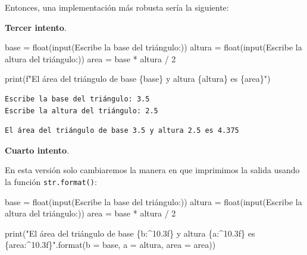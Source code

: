 \documentclass[
  spanish,
  letterpaper,
]{scrbook}
\newenvironment{Shaded}{\begin{snugshade}}{\end{snugshade}}
\newcommand{\BuiltInTok}[1]{\textcolor[rgb]{0.00,0.23,0.31}{#1}}
\newcommand{\DecValTok}[1]{\textcolor[rgb]{0.68,0.00,0.00}{#1}}
\newcommand{\NormalTok}[1]{\textcolor[rgb]{0.00,0.23,0.31}{#1}}
\newcommand{\OperatorTok}[1]{\textcolor[rgb]{0.37,0.37,0.37}{#1}}
\newcommand{\SpecialCharTok}[1]{\textcolor[rgb]{0.37,0.37,0.37}{#1}}
\newcommand{\SpecialStringTok}[1]{\textcolor[rgb]{0.13,0.47,0.30}{#1}}
\newcommand{\StringTok}[1]{\textcolor[rgb]{0.13,0.47,0.30}{#1}}
\theoremstyle{definition}
\theoremstyle{remark}
\begin{document}
Entonces, una implementación más robusta sería la siguiente:

\textbf{Tercer intento}.

\begin{Shaded}
\begin{Highlighting}[]
\NormalTok{base }\OperatorTok{=} \BuiltInTok{float}\NormalTok{(}\BuiltInTok{input}\NormalTok{(}\StringTok{\textquotesingle{}Escribe la base del triángulo:\textquotesingle{}}\NormalTok{))}
\NormalTok{altura }\OperatorTok{=} \BuiltInTok{float}\NormalTok{(}\BuiltInTok{input}\NormalTok{(}\StringTok{\textquotesingle{}Escribe la altura del triángulo:\textquotesingle{}}\NormalTok{))}
\NormalTok{area }\OperatorTok{=}\NormalTok{ base }\OperatorTok{*}\NormalTok{ altura }\OperatorTok{/} \DecValTok{2}

\BuiltInTok{print}\NormalTok{(}\SpecialStringTok{f"El área del triángulo de base }\SpecialCharTok{\{}\NormalTok{base}\SpecialCharTok{\}}\SpecialStringTok{ y altura }\SpecialCharTok{\{}\NormalTok{altura}\SpecialCharTok{\}}\SpecialStringTok{ es }\SpecialCharTok{\{}\NormalTok{area}\SpecialCharTok{\}}\SpecialStringTok{"}\NormalTok{)}
\end{Highlighting}
\end{Shaded}

\begin{verbatim}
Escribe la base del triángulo: 3.5
Escribe la altura del triángulo: 2.5
\end{verbatim}

\begin{verbatim}
El área del triángulo de base 3.5 y altura 2.5 es 4.375
\end{verbatim}

\textbf{Cuarto intento}.

En esta versión solo cambiaremos la manera en que imprimimos la salida
usando la función \texttt{str.format()}:

\begin{Shaded}
\begin{Highlighting}[]
\NormalTok{base }\OperatorTok{=} \BuiltInTok{float}\NormalTok{(}\BuiltInTok{input}\NormalTok{(}\StringTok{\textquotesingle{}Escribe la base del triángulo:\textquotesingle{}}\NormalTok{))}
\NormalTok{altura }\OperatorTok{=} \BuiltInTok{float}\NormalTok{(}\BuiltInTok{input}\NormalTok{(}\StringTok{\textquotesingle{}Escribe la altura del triángulo:\textquotesingle{}}\NormalTok{))}
\NormalTok{area }\OperatorTok{=}\NormalTok{ base }\OperatorTok{*}\NormalTok{ altura }\OperatorTok{/} \DecValTok{2}

\BuiltInTok{print}\NormalTok{(}\StringTok{"El área del triángulo de base }\SpecialCharTok{\{b:\^{}10.3f\}}\StringTok{ y altura }\SpecialCharTok{\{a:\^{}10.3f\}}\StringTok{ es }\SpecialCharTok{\{area:\^{}10.3f\}}\StringTok{"}\NormalTok{.}\BuiltInTok{format}\NormalTok{(b }\OperatorTok{=}\NormalTok{ base, a }\OperatorTok{=}\NormalTok{ altura, area }\OperatorTok{=}\NormalTok{ area))}
\end{Highlighting}
\end{Shaded}
\end{document}
